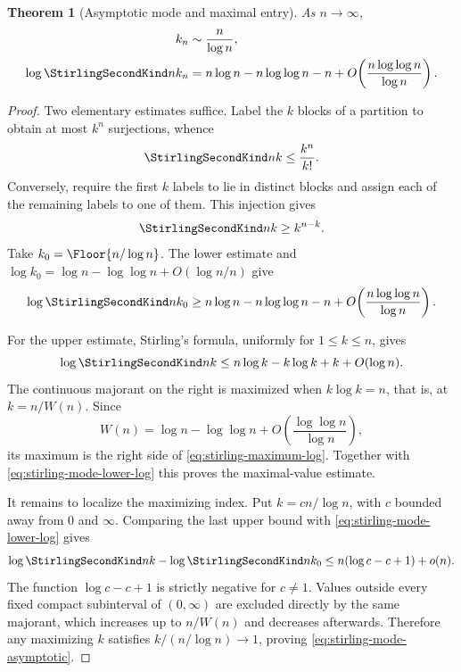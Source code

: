 \documentclass[11pt,a4paper,oneside,openany]{book}
\newtheorem{theorem}{Theorem}[chapter]
\theoremstyle{definition}
\theoremstyle{remark}
\begin{document}
\begin{theorem}[Asymptotic mode and maximal entry]
\label{thm:stirling-mode-asymptotic}
As $n\to\infty$,
\begin{align}
 k_n&\sim\frac{n}{\log n},
 \label{eq:stirling-mode-asymptotic}\\
 \log\StirlingSecondKind n{k_n}
 &=n\log n-n\log\log n-n
   +O\!\left(\frac{n\log\log n}{\log n}\right).
 \label{eq:stirling-maximum-log}
\end{align}
\end{theorem}
\begin{proof}
Two elementary estimates suffice.  Label the $k$ blocks of a partition to obtain
at most $k^n$ surjections, whence
\begin{equation}
\label{eq:stirling-mode-upper}
 \StirlingSecondKind nk\le\frac{k^n}{k!}.
\end{equation}
Conversely, require the first $k$ labels to lie in distinct blocks and assign each
of the remaining labels to one of them.  This injection gives
\begin{equation}
\label{eq:stirling-mode-lower}
 \StirlingSecondKind nk\ge k^{n-k}.
\end{equation}
Take $k_0=\Floor{n/\log n}$.  The lower estimate and
$\log k_0=\log n-\log\log n+O(\log n/n)$ give
\begin{equation}
\label{eq:stirling-mode-lower-log}
 \log\StirlingSecondKind n{k_0}
 \ge n\log n-n\log\log n-n
     +O\!\left(\frac{n\log\log n}{\log n}\right).
\end{equation}

For the upper estimate, Stirling's formula, uniformly for $1\le k\le n$, gives
\[
 \log\StirlingSecondKind nk
 \le n\log k-k\log k+k+O(\log n).
\]
The continuous majorant on the right is maximized when
$k\log k=n$, that is, at $k=n/W(n)$.  Since
\[
 W(n)=\log n-\log\log n
      +O\!\left(\frac{\log\log n}{\log n}\right),
\]
its maximum is the right side of \eqref{eq:stirling-maximum-log}.  Together with
\eqref{eq:stirling-mode-lower-log} this proves the maximal-value estimate.

It remains to localize the maximizing index.  Put
$k=c n/\log n$, with $c$ bounded away from $0$ and $\infty$.  Comparing the last
upper bound with \eqref{eq:stirling-mode-lower-log} gives
\[
 \log\StirlingSecondKind nk-\log\StirlingSecondKind n{k_0}
 \le n(\log c-c+1)+o(n).
\]
The function $\log c-c+1$ is strictly negative for $c\ne1$.  Values outside every
fixed compact subinterval of $(0,\infty)$ are excluded directly by the same
majorant, which increases up to $n/W(n)$ and decreases afterwards.  Therefore any
maximizing $k$ satisfies $k/(n/\log n)\to1$, proving
\eqref{eq:stirling-mode-asymptotic}.
\end{proof}
\end{document}

